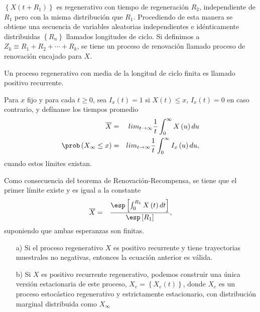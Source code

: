 $\left\{X\left(t+R_{1}\right)\right\}$ es regenerativo con tiempo de regeneraci\'on $R_{2}$, independiente de $R_{1}$ pero con la misma distribuci\'on que $R_{1}$. Procediendo de esta manera se obtiene una secuencia de variables aleatorias independientes e id\'enticamente distribuidas $\left\{R_{n}\right\}$ llamados longitudes de ciclo. Si definimos a $Z_{k}\equiv R_{1}+R_{2}+\cdots+R_{k}$, se tiene un proceso de renovaci\'on llamado proceso de renovaci\'on encajado para $X$.

\begin{Note}
Un proceso regenerativo con media de la longitud de ciclo finita es llamado positivo recurrente.
\end{Note}


\begin{Def}
Para $x$ fijo y para cada $t\geq0$, sea $I_{x}\left(t\right)=1$ si $X\left(t\right)\leq x$,  $I_{x}\left(t\right)=0$ en caso contrario, y def\'inanse los tiempos promedio
\begin{eqnarray*}
\overline{X}&=&lim_{t\rightarrow\infty}\frac{1}{t}\int_{0}^{\infty}X\left(u\right)du\\
\prob\left(X_{\infty}\leq x\right)&=&lim_{t\rightarrow\infty}\frac{1}{t}\int_{0}^{\infty}I_{x}\left(u\right)du,
\end{eqnarray*}
cuando estos l\'imites existan.
\end{Def}

Como consecuencia del teorema de Renovaci\'on-Recompensa, se tiene que el primer l\'imite  existe y es igual a la constante
\begin{eqnarray*}
\overline{X}&=&\frac{\esp\left[\int_{0}^{R_{1}}X\left(t\right)dt\right]}{\esp\left[R_{1}\right]},
\end{eqnarray*}
suponiendo que ambas esperanzas son finitas.

\begin{Note}
\begin{itemize}
\item[a)] Si el proceso regenerativo $X$ es positivo recurrente y tiene trayectorias muestrales no negativas, entonces la ecuaci\'on anterior es v\'alida.
\item[b)] Si $X$ es positivo recurrente regenerativo, podemos construir una \'unica versi\'on estacionaria de este proceso, $X_{e}=\left\{X_{e}\left(t\right)\right\}$, donde $X_{e}$ es un proceso estoc\'astico regenerativo y estrictamente estacionario, con distribuci\'on marginal distribuida como $X_{\infty}$
\end{itemize}
\end{Note}

